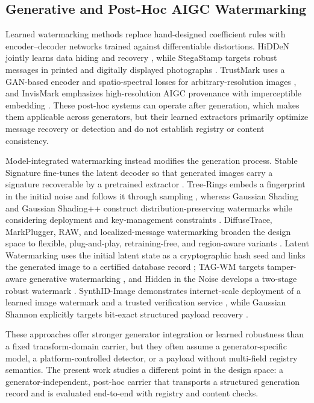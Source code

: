 \documentclass[a4paper,fleqn]{cas-sc}
\begin{document}
\subsection{Generative and Post-Hoc AIGC Watermarking}
Learned watermarking methods replace hand-designed coefficient rules with
encoder--decoder networks trained against differentiable distortions. HiDDeN
jointly learns data hiding and recovery \cite{ferrari_hidden_2018}, while
StegaStamp targets robust messages in printed and digitally displayed
photographs \cite{tancik_stegastamp_2020}. TrustMark uses a GAN-based encoder
and spatio-spectral losses for arbitrary-resolution images
\cite{bui_trustmark_2023}, and InvisMark emphasizes high-resolution AIGC
provenance with imperceptible embedding \cite{xu_invismark_2025}. These
post-hoc systems can operate after generation, which makes them applicable
across generators, but their learned extractors primarily optimize message
recovery or detection and do not establish registry or content consistency.

Model-integrated watermarking instead modifies the generation process. Stable
Signature fine-tunes the latent decoder so that generated images carry a
signature recoverable by a pretrained extractor
\cite{fernandez_stable_2023}. Tree-Rings embeds a fingerprint in the initial
noise and follows it through sampling \cite{wen_tree-rings_2023}, whereas
Gaussian Shading and Gaussian Shading++ construct distribution-preserving
watermarks while considering deployment and key-management constraints
\cite{yang_gaussian_2024,yang_gaussian_2025}. DiffuseTrace, MarkPlugger, RAW,
and localized-message watermarking broaden the design space to flexible,
plug-and-play, retraining-free, and region-aware variants
\cite{lei_diffusetrace_2025,zhang_markplugger_2025,xian_raw_2024,sander_watermark_2025}.
Latent Watermarking uses the initial latent state as a cryptographic hash seed
and links the generated image to a certified database record
\cite{chen_latent_2025}; TAG-WM targets tamper-aware generative watermarking
\cite{chen_tag-wm_2025}, and Hidden in the Noise develops a two-stage robust
watermark \cite{arabi_hidden_2025}.
SynthID-Image demonstrates internet-scale deployment of a learned image
watermark and a trusted verification service \cite{gowal_synthid-image_2025},
while Gaussian Shannon explicitly targets bit-exact structured payload
recovery \cite{zhang_gaussian_2026}.

These approaches offer stronger generator integration or learned robustness
than a fixed transform-domain carrier, but they often assume a
generator-specific model, a platform-controlled detector, or a payload without
multi-field registry semantics. The present work studies a different point in
the design space: a generator-independent, post-hoc carrier that transports a
structured generation record and is evaluated end-to-end with registry and
content checks.
\end{document}
